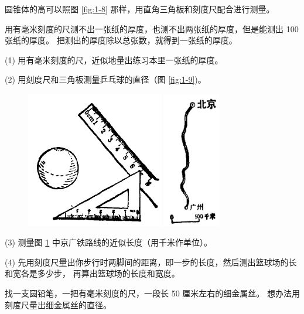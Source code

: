 圆锥体的高可以照图 \ref{fig:1-8} 那样，用直角三角板和刻度尺配合进行测量。

用有毫米刻度的尺测不出一张纸的厚度，也测不出两张纸的厚度，但是能测出 100 张纸的厚度。
把测出的厚度除以总张数，就得到一张纸的厚度。

\lianxi

(1) 用有毫米刻度的尺，近似地量出练习本里一张纸的厚度。

(2) 用刻度尺和三角板测量乒乓球的直径（图 \ref{fig:1-9})。


\begin{figure}[htbp]
  \centering
  \begin{minipage}{6cm}
  \centering
  \includegraphics[width=6cm]{../pic/czwl1-ch1-9}
  \caption{}\label{fig:1-9}
  \end{minipage}
  \qquad
  \begin{minipage}{4cm}
  \centering
  \includegraphics[width=2.5cm]{../pic/czwl1-ch1-10}
  \caption{}\label{fig:1-10}
  \end{minipage}
\end{figure}

(3) 测量图 \ref{fig:1-10} 中京广铁路线的近似长度（用千米作单位）。

(4) 先用刻度尺量出你步行时两脚间的距离，即一步的长度，然后测出篮球场的长和宽各是多少步，
再算出篮球场的长度和宽度。



找一支圆铅笔，一把有毫米刻度的尺，一段长 50 厘米左右的细金属丝。
想办法用刻度尺量出细金属丝的直径。


